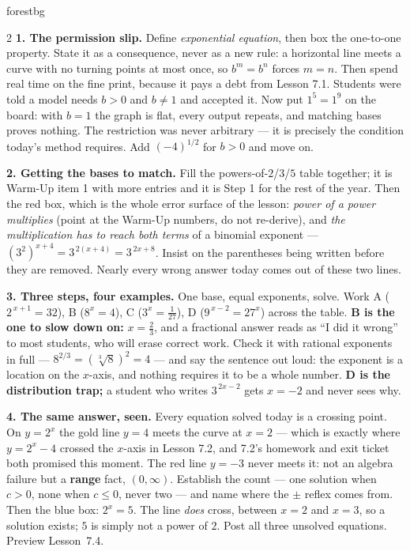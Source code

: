 \documentclass[10pt]{article}
\begin{document}
\begin{skillbox}[Lesson]{forestbg}
\begin{multicols}{2}
\textbf{1. The permission slip.} Define \emph{exponential equation}, then box the one-to-one property.
State it as a consequence, never as a new rule: a horizontal line meets a curve with no turning points
at most once, so $b^{m}=b^{n}$ forces $m=n$. Then spend real time on the fine print, because it pays a
debt from Lesson 7.1. Students were told a model needs $b>0$ and $b\neq1$ and accepted it. Now put
$1^{5}=1^{9}$ on the board: with $b=1$ the graph is flat, every output repeats, and matching bases
proves nothing. The restriction was never arbitrary --- it is precisely the condition today's method
requires. Add $(-4)^{1/2}$ for $b>0$ and move on.

\textbf{2. Getting the bases to match.} Fill the powers-of-$2$/$3$/$5$ table together; it is Warm-Up
item 1 with more entries and it is Step 1 for the rest of the year. Then the red box, which is the
whole error surface of the lesson: \emph{power of a power multiplies} (point at the Warm-Up numbers,
do not re-derive), and \emph{the multiplication has to reach both terms} of a binomial exponent ---
$\left(3^{2}\right)^{x+4}=3^{\,2(x+4)}=3^{\,2x+8}$. Insist on the parentheses being written before
they are removed. Nearly every wrong answer today comes out of these two lines.

\columnbreak

\textbf{3. Three steps, four examples.} One base, equal exponents, solve. Work A ($2^{\,x+1}=32$),
B ($8^{x}=4$), C ($3^{x}=\frac1{27}$), D ($9^{\,x-2}=27^{x}$) across the table. \textbf{B is the one to
slow down on:} $x=\frac23$, and a fractional answer reads as ``I did it wrong'' to most students, who
will erase correct work. Check it with rational exponents in full --- $8^{2/3}=\left(\sqrt[3]8\right)^{2}=4$
--- and say the sentence out loud: the exponent is a location on the $x$-axis, and nothing requires it to
be a whole number. \textbf{D is the distribution trap;} a student who writes $3^{\,2x-2}$ gets $x=-2$
and never sees why.

\textbf{4. The same answer, seen.} Every equation solved today is a crossing point. On $y=2^{x}$ the
gold line $y=4$ meets the curve at $x=2$ --- which is exactly where $y=2^{x}-4$ crossed the $x$-axis in
Lesson 7.2, and 7.2's homework and exit ticket both promised this moment. The red line $y=-3$ never
meets it: not an algebra failure but a \textbf{range} fact, $(0,\infty)$. Establish the count --- one
solution when $c>0$, none when $c\le0$, never two --- and name where the $\pm$ reflex comes from. Then
the blue box: $2^{x}=5$. The line \emph{does} cross, between $x=2$ and $x=3$, so a solution exists;
$5$ is simply not a power of $2$. Post all three unsolved equations. Preview Lesson~7.4.
\end{multicols}
\end{skillbox}
\end{document}
